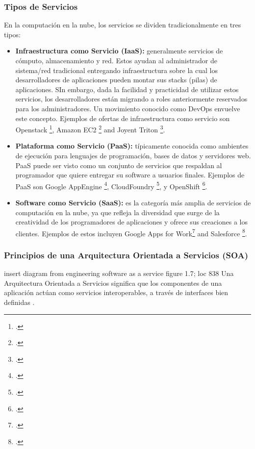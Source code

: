         \subsubsection{Tipos de Servicios}
        En la computación en la nube, los servicios se dividen tradicionalmente en tres tipos:
        \begin{itemize}
            \item \textbf{Infraestructura como Servicio (IaaS):} generalmente servicios de cómputo, almacenamiento y red. Estos ayudan al administrador de sistema/red tradicional entregando infraestructura sobre la cual los desarrolladores de aplicaciones pueden montar sus stacks (pilas) de aplicaciones. SIn embargo, dada la facilidad y practicidad de utilizar estos servicios, los desarrolladores están migrando a roles anteriormente reservados para los administradores. Un movimiento conocido como DevOps envuelve este concepto. Ejemplos de ofertas de infraestructura como servicio son Openstack \footcite{Openstack2016-od}, Amazon EC2 \footcite{Aws2016-fc} and Joyent Triton \footcite{Joyent2016-wr}.
            \item \textbf{Plataforma como Servicio (PaaS): }típicamente conocida como ambientes de ejecución para lenguajes de programación, bases de datos y servidores web. PaaS puede ser visto como un conjunto de servicios que respaldan al programador que quiere entregar su software a usuarios finales. Ejemplos de PaaS son Google AppEngine \footcite{Google2016-zb}, CloudFoundry \footcite{Cloudfoundry2016-vz}, y OpenShift \footcite{RedHat2016-sb}.
            \item \textbf{Software como Servicio (SaaS):} es la categoría más amplia de servicios de computación en la nube, ya que refleja la diversidad que surge de la creatividad de los programadores de aplicaciones y ofrece sus creaciones a los clientes. Ejemplos de estos incluyen Google Apps for Work\footcite{Google2016-ts} and Salesforce \footcite{Salesforce2016-mo}.
        \end{itemize}

        \subsubsection{Principios de una Arquitectura Orientada a Servicios (SOA)}
        \todonum insert diagram from engineering software as a service figure 1.7; loc 838
        Una Arquitectura Orientada a Servicios significa que los componentes de una aplicación actúan como servicios interoperables, a través de interfaces bien definidas .
        
